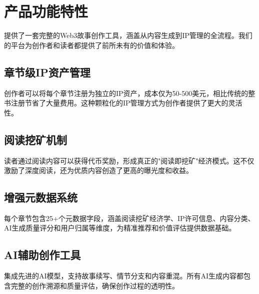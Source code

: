 \section{产品功能特性}\label{sec:product-features-cn}

\storyhouse{}提供了一套完整的Web3故事创作工具，涵盖从内容生成到IP管理的全流程。我们的平台为创作者和读者都提供了前所未有的价值和体验。

\subsection{章节级IP资产管理}

创作者可以将每个章节注册为独立的IP资产，成本仅为50-500美元，相比传统的整书注册节省了大量费用。这种颗粒化的IP管理方式为创作者提供了更大的灵活性。

\subsection{阅读挖矿机制}

读者通过阅读内容可以获得\tip{}代币奖励，形成真正的"阅读即挖矿"经济模式。这不仅激励了深度阅读，还为优质内容创造了更高的曝光度和收益。

\subsection{增强元数据系统}

每个章节包含25+个元数据字段，涵盖阅读挖矿经济学、IP许可信息、内容分类、AI生成质量评分和用户归属等维度，为精准推荐和价值评估提供数据基础。

\subsection{AI辅助创作工具}

集成先进的AI模型，支持故事续写、情节分支和内容重混。所有AI生成内容都包含完整的创作溯源和质量评估，确保创作过程的透明性。